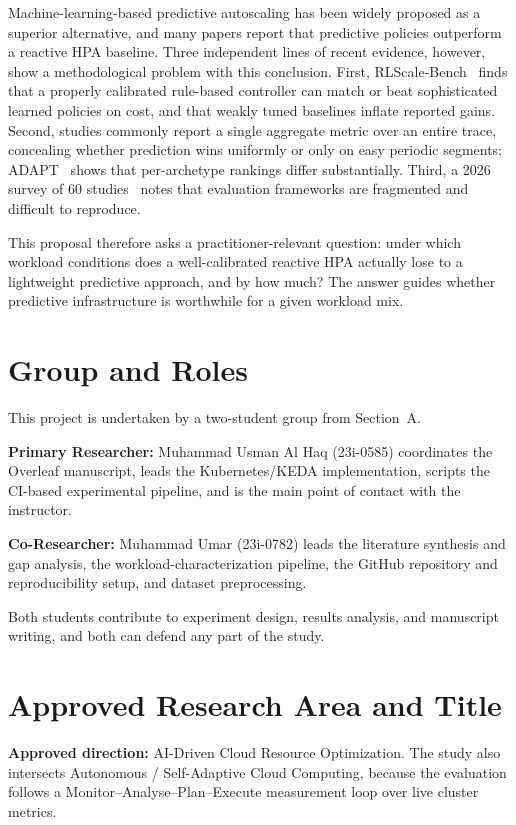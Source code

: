\documentclass[journal]{IEEEtran}
\begin{document}
Machine-learning-based predictive autoscaling has been widely proposed as a superior alternative, and many papers report that predictive policies outperform a reactive HPA baseline. Three independent lines of recent evidence, however, show a methodological problem with this conclusion. First, RLScale-Bench~\cite{rlscale2026} finds that a properly calibrated rule-based controller can match or beat sophisticated learned policies on cost, and that weakly tuned baselines inflate reported gains. Second, studies commonly report a single aggregate metric over an entire trace, concealing whether prediction wins uniformly or only on easy periodic segments; ADAPT~\cite{adapt2026} shows that per-archetype rankings differ substantially. Third, a 2026 survey of 60 studies~\cite{mca2026} notes that evaluation frameworks are fragmented and difficult to reproduce.

This proposal therefore asks a practitioner-relevant question: under which workload conditions does a well-calibrated reactive HPA actually lose to a lightweight predictive approach, and by how much? The answer guides whether predictive infrastructure is worthwhile for a given workload mix.

\section{Group and Roles}
This project is undertaken by a two-student group from Section~A.

\textbf{Primary Researcher:} Muhammad Usman Al Haq (23i-0585) coordinates the Overleaf manuscript, leads the Kubernetes/KEDA implementation, scripts the CI-based experimental pipeline, and is the main point of contact with the instructor.

\textbf{Co-Researcher:} Muhammad Umar (23i-0782) leads the literature synthesis and gap analysis, the workload-characterization pipeline, the GitHub repository and reproducibility setup, and dataset preprocessing.

Both students contribute to experiment design, results analysis, and manuscript writing, and both can defend any part of the study.

\section{Approved Research Area and Title}
\textbf{Approved direction:} AI-Driven Cloud Resource Optimization. The study also intersects Autonomous / Self-Adaptive Cloud Computing, because the evaluation follows a Monitor--Analyse--Plan--Execute measurement loop over live cluster metrics.
\end{document}
